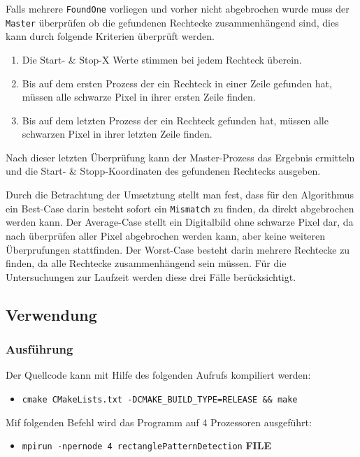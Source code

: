 Falls mehrere \texttt{FoundOne} vorliegen und vorher nicht abgebrochen wurde muss der \texttt{Master} überprüfen ob die gefundenen Rechtecke zusammenhängend sind, dies kann durch folgende Kriterien überprüft werden.

\begin{enumerate}
	\item Die Start- \& Stop-X Werte stimmen bei jedem Rechteck überein.
	\item Bis auf dem ersten Prozess der ein Rechteck in einer Zeile gefunden hat, müssen alle schwarze Pixel in ihrer ersten Zeile finden.
	\item Bis auf dem letzten Prozess der ein Rechteck gefunden hat, müssen alle schwarzen Pixel in ihrer letzten Zeile finden.
\end{enumerate}

Nach dieser letzten Überprüfung kann der Master-Prozess das Ergebnis ermitteln und die Start- \& Stopp-Koordinaten des gefundenen Rechtecks ausgeben. 

Durch die Betrachtung der Umsetztung stellt man fest, dass für den Algorithmus ein Best-Case darin besteht sofort ein \texttt{Mismatch} zu finden, da direkt abgebrochen werden kann. Der Average-Case stellt ein Digitalbild ohne schwarze Pixel dar, da nach überprüfen aller Pixel abgebrochen werden kann, aber keine weiteren Überprufungen stattfinden. Der Worst-Case besteht darin mehrere Rechtecke zu finden, da alle Rechtecke zusammenhängend sein müssen. Für die Untersuchungen zur Laufzeit werden diese drei Fälle berücksichtigt.


\subsection{Verwendung}
\subsubsection{Ausführung}
Der Quellcode kann mit Hilfe des folgenden Aufrufs kompiliert werden:

\begin{itemize}
	\item \texttt{cmake CMakeLists.txt -DCMAKE\_BUILD\_TYPE=RELEASE \&\& make}
\end{itemize}

Mif folgenden Befehl wird das Programm auf 4 Prozessoren ausgeführt:

\begin{itemize}
	\item \texttt{mpirun -npernode 4 rectanglePatternDetection} \textbf{FILE}
\end{itemize}

